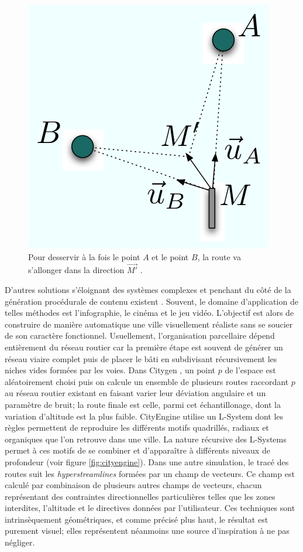 \documentclass[12pt]{article}
\begin{document}
\begin{figure}[H]
  \centering
  \includegraphics[width=.5\linewidth]{images/barthelemy-road.png}
  \caption{Pour desservir à la fois le point $A$ et le point $B$, la
    route va s'allonger dans la direction $\vec{M'}$
    \cite{Barthelemy2008,Barthelemy2009}.}
  \label{fig:barthelemy}
\end{figure}

D'autres solutions s'éloignant des systèmes complexes et penchant du
côté de la génération procédurale de contenu existent
\cite{Kelly2006}. Souvent, le domaine d'application de telles méthodes
est l'infographie, le cinéma et le jeu vidéo. L'objectif est alors de
construire de manière automatique une ville visuellement réaliste sans
se soucier de son caractère fonctionnel. Usuellement, l'organisation
parcellaire dépend entièrement du réseau routier car la première étape
est souvent de générer un réseau viaire complet puis de placer le bâti
en subdivisant récursivement les niches vides formées par les
voies. Dans Citygen \cite{Kelly2006b}, un point $p$ de l'espace est
aléatoirement choisi puis on calcule un ensemble de plusieurs routes
raccordant $p$ au réseau routier existant en faisant varier leur
déviation angulaire et un paramètre de bruit; la route finale est
celle, parmi cet échantillonage, dont la variation d'altitude est la
plus faible. CityEngine \cite{Parish2001} utilise un L-System dont les
règles permettent de reproduire les différents motifs quadrillés,
radiaux et organiques que l'on retrouve dans une ville. La nature
récursive des L-Systems permet à ces motifs de se combiner et
d'apparaître à différents niveaux de profondeur (voir figure
\ref{fig:cityengine}). Dans une autre simulation, le tracé des routes
suit les \textit{hyperstreamlines} \cite{Chen2008} formées par un
champ de vecteurs. Ce champ est calculé par combinaison de plusieurs
autres champs de vecteurs, chacun représentant des contraintes
directionnelles particulières telles que les zones interdites,
l'altitude et le directives données par l'utilisateur. Ces techniques
sont intrinsèquement géométriques, et comme précisé plus haut, le
résultat est purement visuel; elles représentent néanmoins une source
d'inspiration à ne pas négliger.
\end{document}
